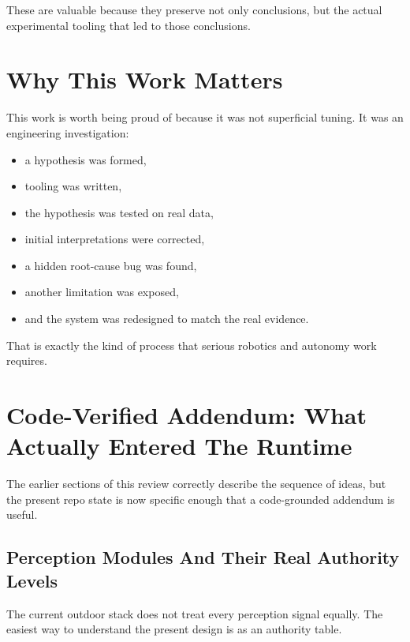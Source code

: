 \documentclass[11pt]{article}
\begin{document}
These are valuable because they preserve not only conclusions, but the actual experimental tooling that led to those conclusions.

\section{Why This Work Matters}
This work is worth being proud of because it was not superficial tuning. It was an engineering investigation:
\begin{itemize}[leftmargin=*]
\item a hypothesis was formed,
\item tooling was written,
\item the hypothesis was tested on real data,
\item initial interpretations were corrected,
\item a hidden root-cause bug was found,
\item another limitation was exposed,
\item and the system was redesigned to match the real evidence.
\end{itemize}

That is exactly the kind of process that serious robotics and autonomy work requires.


\section{Code-Verified Addendum: What Actually Entered The Runtime}
The earlier sections of this review correctly describe the sequence of ideas, but the present repo state is now specific enough that a code-grounded addendum is useful.

\subsection{Perception Modules And Their Real Authority Levels}
The current outdoor stack does not treat every perception signal equally. The easiest way to understand the present design is as an authority table.
\end{document}

